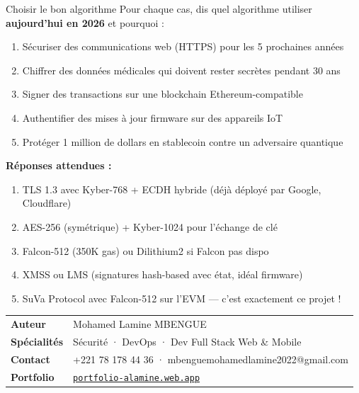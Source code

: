 \documentclass[12pt, a4paper]{article}
\begin{document}
\begin{pratique}{Choisir le bon algorithme}
Pour chaque cas, dis quel algorithme utiliser \textbf{aujourd'hui en 2026} et pourquoi :

\begin{enumerate}
  \item Sécuriser des communications web (HTTPS) pour les 5 prochaines années
  \item Chiffrer des données médicales qui doivent rester secrètes pendant 30 ans
  \item Signer des transactions sur une blockchain Ethereum-compatible
  \item Authentifier des mises à jour firmware sur des appareils IoT
  \item Protéger 1 million de dollars en stablecoin contre un adversaire quantique
\end{enumerate}

\textbf{Réponses attendues :}
\begin{enumerate}
  \item TLS 1.3 avec Kyber-768 + ECDH hybride (déjà déployé par Google, Cloudflare)
  \item AES-256 (symétrique) + Kyber-1024 pour l'échange de clé
  \item Falcon-512 (350K gas) ou Dilithium2 si Falcon pas dispo
  \item XMSS ou LMS (signatures hash-based avec état, idéal firmware)
  \item SuVa Protocol avec Falcon-512 sur l'EVM --- c'est exactement ce projet !
\end{enumerate}
\end{pratique}

\vspace{1cm}

\begin{tcolorbox}[colback=suva_blue!5, colframe=suva_blue!40,
  left=6pt, right=6pt, top=4pt, bottom=4pt]
\small\begin{tabular}{ll}
  \textbf{Auteur} & Mohamed Lamine MBENGUE \\
  \textbf{Spécialités} & Sécurité · DevOps · Dev Full Stack Web \& Mobile \\
  \textbf{Contact} & +221 78 178 44 36 · mbenguemohamedlamine2022@gmail.com \\
  \textbf{Portfolio} & \href{https://portfolio-alamine.web.app}{\texttt{portfolio-alamine.web.app}} \\
\end{tabular}
\end{tcolorbox}
\end{document}
